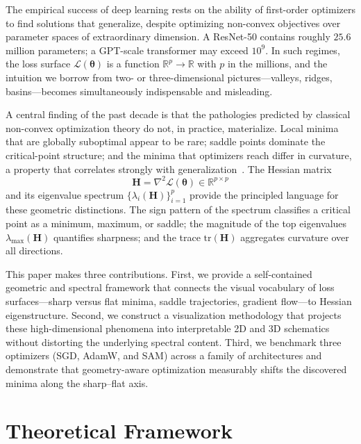 \documentclass[twocolumn,10pt]{article}
\newcommand{\Hmat}{\mathbf{H}}
\newcommand{\Ltheta}{\mathcal{L}(\boldsymbol{\theta})}
\newcommand{\grad}{\nabla}
\newcommand{\R}{\mathbb{R}}
\begin{document}
The empirical success of deep learning rests on the ability of first-order optimizers to find solutions that generalize, despite optimizing non-convex objectives over parameter spaces of extraordinary dimension. A ResNet-50 contains roughly $25.6$ million parameters; a GPT-scale transformer may exceed $10^9$. In such regimes, the loss surface $\Ltheta$ is a function $\R^p \to \R$ with $p$ in the millions, and the intuition we borrow from two- or three-dimensional pictures---valleys, ridges, basins---becomes simultaneously indispensable and misleading.

A central finding of the past decade is that the pathologies predicted by classical non-convex optimization theory do not, in practice, materialize. Local minima that are globally suboptimal appear to be rare; saddle points dominate the critical-point structure; and the minima that optimizers reach differ in curvature, a property that correlates strongly with generalization~\cite{dauphin2014identifying,keskar2017large,chaudhari2019entropy}. The Hessian matrix
\begin{equation}
\Hmat = \grad^2 \mathcal{L}(\boldsymbol{\theta}) \in \R^{p \times p}
\label{eq:hessian}
\end{equation}
and its eigenvalue spectrum $\{\lambda_i(\Hmat)\}_{i=1}^{p}$ provide the principled language for these geometric distinctions. The sign pattern of the spectrum classifies a critical point as a minimum, maximum, or saddle; the magnitude of the top eigenvalues $\lambda_{\max}(\Hmat)$ quantifies sharpness; and the trace $\mathrm{tr}(\Hmat)$ aggregates curvature over all directions.

This paper makes three contributions. First, we provide a self-contained geometric and spectral framework that connects the visual vocabulary of loss surfaces---sharp versus flat minima, saddle trajectories, gradient flow---to Hessian eigenstructure. Second, we construct a visualization methodology that projects these high-dimensional phenomena into interpretable 2D and 3D schematics without distorting the underlying spectral content. Third, we benchmark three optimizers (SGD, AdamW, and SAM) across a family of architectures and demonstrate that geometry-aware optimization measurably shifts the discovered minima along the sharp--flat axis.

\section{Theoretical Framework}
\label{sec:theory}
\end{document}
